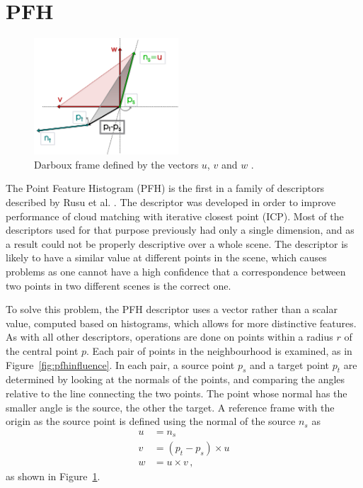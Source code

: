 \documentclass[11pt,a4paper]{kth-mag}
\begin{document}
\section{PFH}
\begin{figure}
  \centering
  \includegraphics[width=0.48\textwidth]{images/darboux}
  \caption{Darboux frame defined by the vectors $u$, $v$ and $w$ \cite{rusu2008learning}.}
  \label{fig:darboux}
\end{figure}
The Point Feature Histogram (PFH) is the first in a family of descriptors
described by Rusu et al. \cite{rusu2008aligning}. The descriptor was developed
in order to improve performance of cloud matching with iterative closest point
(ICP). Most of the descriptors used for that purpose previously had only a
single dimension, and as a result could not be properly descriptive over a whole
scene. The descriptor is likely to have a similar value at different points in
the scene, which causes problems as one cannot have a high confidence that a
correspondence between two points in two different scenes is the correct one.

To solve this problem, the PFH descriptor uses a vector rather than a scalar
value, computed based on histograms, which allows for more distinctive features.
As with all other descriptors, operations are done on points within a radius $r$
of the central point $p$. Each pair of points in the neighbourhood is examined,
as in Figure~\ref{fig:pfhinfluence}. In each pair, a source point $p_s$ and a
target point $p_t$ are determined by looking at the normals of the points, and
comparing the angles relative to the line connecting the two points. The point
whose normal has the smaller angle is the source, the other the target. A
reference frame with the origin as the source point is defined using the normal
of the source $n_s$ as
\begin{align}
  \label{eq:19}
  u&=n_s\\
  v&=(p_t-p_s)\times u\\
  w&=u\times v\,,
\end{align}
as shown in Figure~\ref{fig:darboux}.
\end{document}
